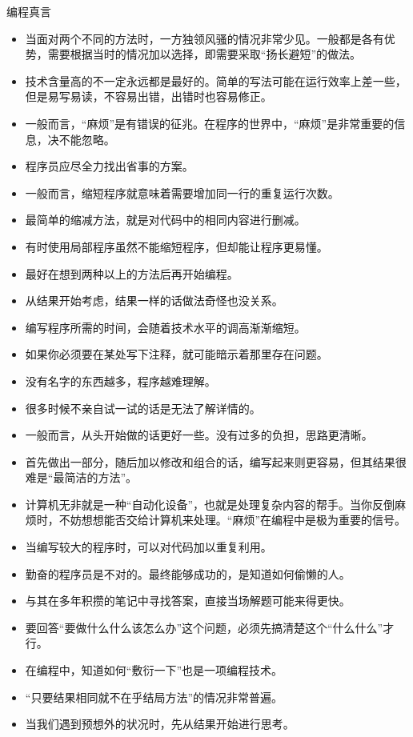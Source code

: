 \begin{frame}
\begin{block}{编程真言}
\begin{itemize}
      \item 当面对两个不同的方法时，一方独领风骚的情况非常少见。一般都是各有优势，需要根据当时的情况加以选择，即需要采取“扬长避短”的做法。
      \item 技术含量高的不一定永远都是最好的。简单的写法可能在运行效率上差一些，但是易写易读，不容易出错，出错时也容易修正。
      \item 一般而言，“麻烦”是有错误的征兆。在程序的世界中，“麻烦”是非常重要的信息，决不能忽略。
      \item 程序员应尽全力找出省事的方案。
      \item 一般而言，缩短程序就意味着需要增加同一行的重复运行次数。
      \item 最简单的缩减方法，就是对代码中的相同内容进行删减。
      \item 有时使用局部程序虽然不能缩短程序，但却能让程序更易懂。
      \item 最好在想到两种以上的方法后再开始编程。
      \item 从结果开始考虑，结果一样的话做法奇怪也没关系。
      \item 编写程序所需的时间，会随着技术水平的调高渐渐缩短。
      \item 如果你必须要在某处写下注释，就可能暗示着那里存在问题。
      \item 没有名字的东西越多，程序越难理解。
      \item 很多时候不亲自试一试的话是无法了解详情的。
      \item 一般而言，从头开始做的话更好一些。没有过多的负担，思路更清晰。
      \item 首先做出一部分，随后加以修改和组合的话，编写起来则更容易，但其结果很难是“最简洁的方法”。
      \item 计算机无非就是一种“自动化设备”，也就是处理复杂内容的帮手。当你反倒麻烦时，不妨想想能否交给计算机来处理。“麻烦”在编程中是极为重要的信号。
      \item 当编写较大的程序时，可以对代码加以重复利用。
      \item 勤奋的程序员是不对的。最终能够成功的，是知道如何偷懒的人。
      \item 与其在多年积攒的笔记中寻找答案，直接当场解题可能来得更快。
      \item 要回答“要做什么什么该怎么办”这个问题，必须先搞清楚这个“什么什么”才行。
      \item 在编程中，知道如何“敷衍一下”也是一项编程技术。
      \item “只要结果相同就不在乎结局方法”的情况非常普遍。
      \item 当我们遇到预想外的状况时，先从结果开始进行思考。

\end{itemize}
\end{block}
\end{frame}
